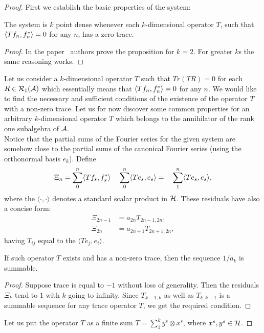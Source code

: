   \begin{proof}
    First we establish the basic properties of the system:
    \begin{prop}
      The system is $k$ point dense whenever each $k$-dimensional operator $T$,
        such that $\inner{Tf_n}{f_n^*} = 0$ for any $n$, has a zero trace.
    \end{prop}
    \begin{proof}
      In the paper~\cite{katavolos} authors prove the proposition for $k = 2$.
      For greater $k$s the same reasoning works.
    \end{proof}
    Let us consider a $k$-dimensional operator $T$ such that $Tr(TR) = 0$ for each $R \in \cal{R}_1(\cal{A})$ which essentially means that
      $\inner{ Tf_n}{f_n^*} = 0$ for any $n$.
    We would like to find the necessary and sufficient conditions of the existence of the operator $T$ with a non-zero trace.
    Let us for now discover some common properties for an arbitrary $k$-dimensional operator $T$ which belongs to the annihilator of the rank one subalgebra of $\cal{A}$.\\
    Notice that the partial sums of the Fourier series for the given system are somehow close to the
      partial sums of the canonical Fourier series (using the orthonormal basis $e_k$). Define
    \[
      \Xi_n = \sum_0^n \inner{Tf_s}{f_s^*} - \sum_0^n \inner{Te_s}{e_s} = -\sum_1^n \inner{Te_s}{e_s},
    \]
      where the $\langle \cdot, \cdot\rangle$ denotes a standard scalar product in $\cal{H}$.
    These residuals have also a concise form:
    \begin{align*}
      \Xi_{2n-1} &= a_{2n}T_{2n - 1, 2n},\\
      \Xi_{2n} &= a_{2n + 1}T_{2n + 1, 2n},
    \end{align*}
      having $T_{ij}$ equal to the $\langle Te_j, e_i \rangle$.
    \begin{remark}
      If such operator $T$ exists and has a non-zero trace, then the sequence $1/a_k$ is summable.
    \end{remark}
    \begin{proof}
      Suppose trace is equal to $-1$ without loss of generality.
      Then the residuals $\Xi_k$ tend to $1$ with $k$ going to infinity. Since $T_{k-1, k}$ as well as $T_{k, k-1}$
        is a summable sequence for any trace operator $T$, we get the required condition.
    \end{proof}
    Let us put the operator $T$ as a finite sum $T = \sum_1^k y^s \otimes x^s$,
      where $x^s, y^s \in \cal{H}$.

\end{proof}
